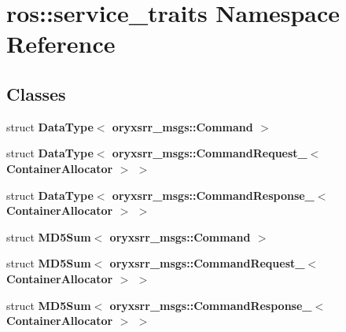 \section{ros\-:\-:service\-\_\-traits \-Namespace \-Reference}
\label{namespaceros_1_1service__traits}
\subsection*{\-Classes}
\begin{DoxyCompactItemize}
\item 
struct {\bf \-Data\-Type$<$ oryxsrr\-\_\-msgs\-::\-Command $>$}
\item 
struct {\bf \-Data\-Type$<$ oryxsrr\-\_\-msgs\-::\-Command\-Request\-\_\-$<$ Container\-Allocator $>$ $>$}
\item 
struct {\bf \-Data\-Type$<$ oryxsrr\-\_\-msgs\-::\-Command\-Response\-\_\-$<$ Container\-Allocator $>$ $>$}
\item 
struct {\bf \-M\-D5\-Sum$<$ oryxsrr\-\_\-msgs\-::\-Command $>$}
\item 
struct {\bf \-M\-D5\-Sum$<$ oryxsrr\-\_\-msgs\-::\-Command\-Request\-\_\-$<$ Container\-Allocator $>$ $>$}
\item 
struct {\bf \-M\-D5\-Sum$<$ oryxsrr\-\_\-msgs\-::\-Command\-Response\-\_\-$<$ Container\-Allocator $>$ $>$}
\end{DoxyCompactItemize}
